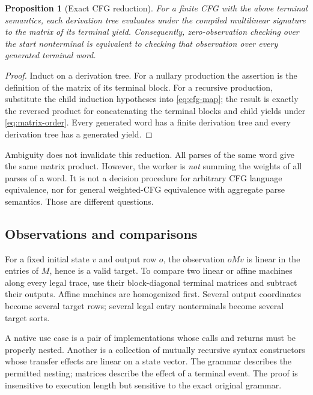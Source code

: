 \documentclass[11pt,letterpaper]{article}
\newtheorem{proposition}[theorem]{Proposition}
\theoremstyle{definition}\newtheorem{definition}[theorem]{Definition}
\theoremstyle{remark}\newtheorem{remark}[theorem]{Remark}
\begin{document}
\begin{proposition}[Exact CFG reduction]\label{prop:cfg}
For a finite CFG with the above terminal semantics, each derivation tree evaluates under the compiled multilinear signature to the matrix of its terminal yield. Consequently, zero-observation checking over the start nonterminal is equivalent to checking that observation over every generated terminal word.
\end{proposition}
\begin{proof}
Induct on a derivation tree. For a nullary production the assertion is the definition of the matrix of its terminal block. For a recursive production, substitute the child induction hypotheses into \eqref{eq:cfg-map}; the result is exactly the reversed product for concatenating the terminal blocks and child yields under \eqref{eq:matrix-order}. Every generated word has a finite derivation tree and every derivation tree has a generated yield.
\end{proof}

Ambiguity does not invalidate this reduction. All parses of the same word give the same matrix product. However, the worker is \emph{not} summing the weights of all parses of a word. It is not a decision procedure for arbitrary CFG language equivalence, nor for general weighted-CFG equivalence with aggregate parse semantics. Those are different questions.

\subsection{Observations and comparisons}
For a fixed initial state $v$ and output row $o$, the observation $oMv$ is linear in the entries of $M$, hence is a valid target. To compare two linear or affine machines along every legal trace, use their block-diagonal terminal matrices and subtract their outputs. Affine machines are homogenized first. Several output coordinates become several target rows; several legal entry nonterminals become several target sorts.

A native use case is a pair of implementations whose calls and returns must be properly nested. Another is a collection of mutually recursive syntax constructors whose transfer effects are linear on a state vector. The grammar describes the permitted nesting; matrices describe the effect of a terminal event. The proof is insensitive to execution length but sensitive to the exact original grammar.
\end{document}
